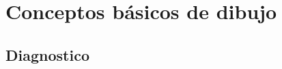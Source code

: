 \documentclass[../main]{subfiles}
\begin{document}
\chapter{Conceptos básicos de dibujo}
\section{Diagnostico}
\subsection{}

\subsection{}

\subsection{}

\subsection{}

\subsection{}

\subsection{}

\end{document}
